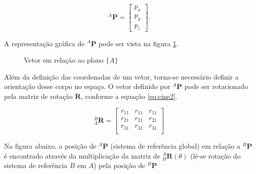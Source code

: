 \begin{equation}\label{eq:cine1}
    {}^A\mathbf{P} = \begin{bmatrix}
    p_x\\ p_y \\ p_z
    \end{bmatrix}.
    \end{equation}

    A representação gráfica de ${}^A\mathbf{P}$ pode ser vista na figura \ref{fig:cine1f}. 

\begin{figure}[!ht]
  \centering
  \caption{Vetor em relação ao plano $\{A\}$}
  \label{fig:cine1f}
  \end{figure}

    Além da definição das coordenadas de um vetor, torna-se necessário definir a orientação desse corpo no espaço. O vetor definido por ${}^A\mathbf{P}$ pode ser rotacionado pela matriz de rotação $\mathbf{R}$, conforme a equação \eqref{eq:cine2}.
 
    \begin{equation}\label{eq:cine2}
    {}_A^B
    \mathbf{R} = 
    \begin{bmatrix}
    r_{11} & r_{11} & r_{11}\\
    r_{21} & r_{21} & r_{21}\\
    r_{31} & r_{31} & r_{31}\\
    \end{bmatrix}
    \end{equation}


    Na figura abaixo, a posição de ${}^A\mathbf{P}$ (sistema de referência global) em relação a ${}^B\mathbf{P}$ é encontrado através da multiplicação da matriz de ${}_B^A \mathbf{R}(\theta)$ (lê-se rotação do sistema de referência $B$ em $A$) pela posição de ${}^B\mathbf{P}$

